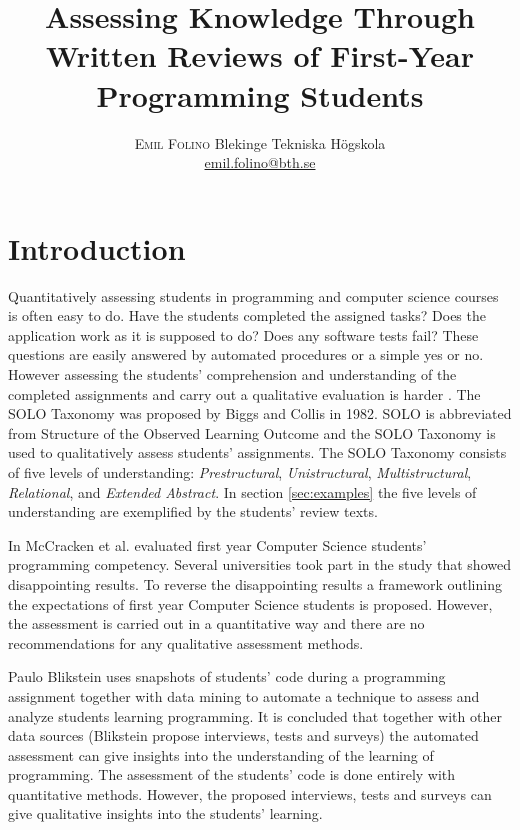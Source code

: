 \documentclass[twoside,twocolumn,a4paper,11pt,english]{article}
\title{Assessing Knowledge Through Written Reviews of First-Year Programming Students} %
\author{%
\textsc{Emil Folino} %
\normalsize Blekinge Tekniska Högskola \\ %
\normalsize \href{mailto:emil.folino@bth.se}{emil.folino@bth.se} %
}
\date{} %
\begin{document}
\maketitle


\section{Introduction}
Quantitatively assessing students in programming and computer science courses is often easy to do. Have the students completed the assigned tasks? Does the application work as it is supposed to do? Does any software tests fail? These questions are easily answered by automated procedures or a simple yes or no. However assessing the students' comprehension and understanding of the completed assignments and carry out a qualitative evaluation is harder \cite{biggs1982evaluation}. The SOLO Taxonomy was proposed by Biggs and Collis in 1982. SOLO is abbreviated from Structure of the Observed Learning Outcome and the SOLO Taxonomy is used to qualitatively assess students' assignments. The SOLO Taxonomy consists of five levels of understanding: \textit{Prestructural}, \textit{Unistructural}, \textit{Multistructural}, \textit{Relational}, and \textit{Extended Abstract}. In section \ref{sec:examples} the five levels of understanding are exemplified by the students' review texts.

In \cite{mccracken2001multi} McCracken et al. evaluated first year Computer Science students' programming competency. Several universities took part in the study that showed disappointing results. To reverse the disappointing results a framework outlining the expectations of first year Computer Science students is proposed. However, the assessment is carried out in a quantitative way and there are no recommendations for any qualitative assessment methods.

Paulo Blikstein \cite{Blikstein} uses snapshots of students' code during a programming assignment together with data mining to automate a technique to assess and analyze students learning programming. It is concluded that together with other data sources (Blikstein propose interviews, tests and surveys) the automated assessment can give insights into the understanding of the learning of programming. The assessment of the students' code is done entirely with quantitative methods. However, the proposed interviews, tests and surveys can give qualitative insights into the students' learning.
\end{document}
